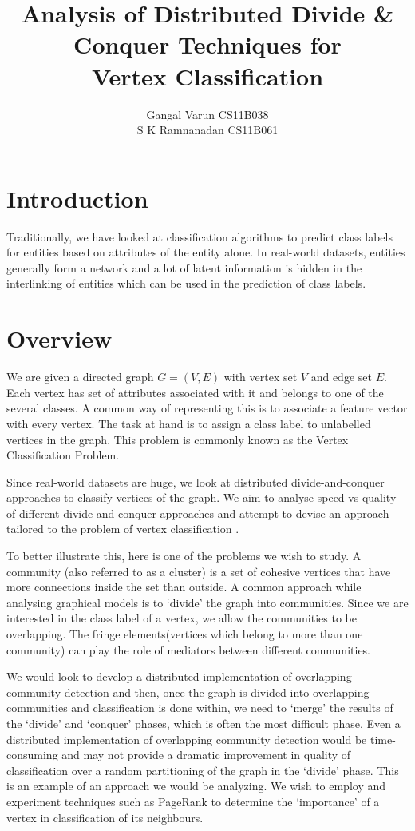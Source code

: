 \documentclass{article}
\begin{document}
\title{\textbf{Analysis of Distributed Divide \& Conquer Techniques for \\Vertex Classification}}
\author{ Gangal Varun CS11B038 \\
		 S K Ramnanadan CS11B061\\
[0.2in]
}
\date{}
\maketitle
\section*{Introduction}
Traditionally, we have looked at classification algorithms to predict class labels for entities based on attributes of the entity alone. In real-world datasets, entities generally form a network and a lot of latent information is hidden in the interlinking of entities which can be used in the prediction of class labels. 
 


\section*{Overview}
We are given a directed graph $G=(V,E)$ with vertex set $V$ and edge set $E$. Each vertex has set of attributes associated with it and belongs to one of the several classes. A common way of representing this is to associate a feature vector with every vertex. The task at hand is to assign a class label to unlabelled vertices in the graph. This problem is commonly known as the Vertex Classification Problem. 

Since real-world datasets are huge, we look at distributed divide-and-conquer approaches to classify vertices of the graph. We aim to analyse speed-vs-quality of different divide and conquer approaches and attempt to devise an approach tailored to the problem of vertex classification . 

To better illustrate this, here is one of the problems we wish to study. A community (also referred to as a cluster) is a set of cohesive vertices that have more connections inside the set than outside. A common approach while analysing graphical models is to ‘divide’ the graph into communities. Since we are interested in the class label of a vertex, we allow the communities to be overlapping. The fringe elements(vertices which belong to more than one community) can play the role of mediators between different communities. 

We would look to develop a distributed implementation of overlapping community detection and then, once the graph is divided into overlapping communities and classification is done within, we need to ‘merge’ the results of the ‘divide’ and ‘conquer’ phases, which is often the most difficult phase. Even a distributed implementation of overlapping community detection would be time-consuming and may not provide a dramatic improvement in quality of classification over a random partitioning of the graph in the ‘divide’ phase. This is an example of an approach we would be analyzing. We wish to employ and experiment techniques such as PageRank to determine the ‘importance’ of a vertex in classification of its neighbours.
\end{document}
